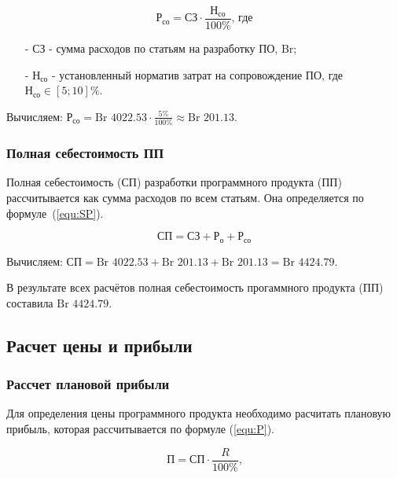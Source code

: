 \begin{equation}
    \label{equ:Pco}
    \text{Р}_\text{со} = \text{СЗ} \cdot \frac{ \text{Н}_\text{со} }{ 100\% } \text{, где}
\end{equation}

\begin{enumerate}
    \item[-] $\text{СЗ}$ - сумма расходов по статьям на разработку ПО, Br; 
    \item[-] $\text{Н}_\text{со}$ - установленный норматив затрат на сопровождение ПО, где $\text{Н}_\text{со} \in [5;10]\%$.
\end{enumerate}

Вычисляем: $\text{Р}_\text{со} = \text{Br } 4022.53 \cdot \frac{ 5\% }{ 100\% } \approx \text{Br } 201.13$.

\subsubsection*{Полная себестоимость ПП}

Полная себестоимость ($\text{СП}$) разработки программного продукта (ПП)
рассчитывается как сумма расходов по всем статьям.
Она определяется по формуле~(\ref{equ:SP}). 

\begin{equation}
    \label{equ:SP}
    \text{СП} = \text{СЗ} + \text{Р}_\text{о} + \text{Р}_\text{со}
\end{equation}

Вычисляем: $\text{СП} = \text{Br } 4022.53 + \text{Br } 201.13 + \text{Br } 201.13 = \text{Br } 4424.79$.

В результате всех расчётов полная себестоимость прогаммного продукта (ПП) составила $\text{Br } 4424.79$.

\subsection{Расчет цены и прибыли}

\subsubsection*{Рассчет плановой прибыли}

Для определения цены программного продукта необходимо расчитать плановую прибыль,
которая рассчитывается по формуле (\ref{equ:P}).

\begin{equation}
    \label{equ:P}
    \text{П} = \text{СП} \cdot \frac{ R }{ 100\% } \text{,}
\end{equation}

